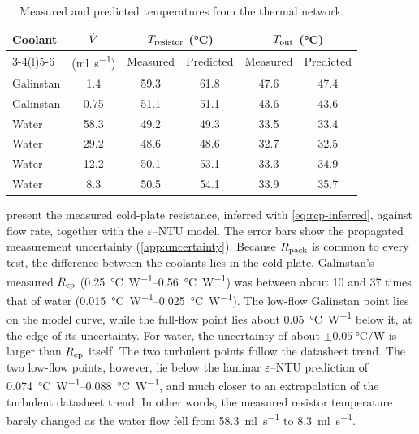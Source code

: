 \begin{table}[htbp]
  \centering
  \caption{Measured and predicted temperatures from the thermal network.}
  \label{tab:tn_results}
  \small
  \begin{tabular}{@{}lccccc@{}}
    \toprule
    Coolant & $\dot{V}$ & \multicolumn{2}{c}{$T_{\mathrm{resistor}}$ (\si{\celsius})}
         & \multicolumn{2}{c}{$T_{\mathrm{out}}$ (\si{\celsius})} \\
    \cmidrule(lr){3-4}\cmidrule(l){5-6}
         & (\si{\milli\litre\per\second}) & Measured & Predicted & Measured & Predicted \\
    \midrule
    Galinstan & 1.4               & 59.3 & 61.8 & 47.6 & 47.4 \\
    Galinstan & 0.75\tnote{a}     & 51.1 & 51.1 & 43.6 & 43.6 \\
    Water     & 58.3\tnote{b}     & 49.2 & 49.3 & 33.5 & 33.4 \\
    Water     & 29.2\tnote{b}     & 48.6 & 48.6 & 32.7 & 32.5 \\
    Water     & 12.2              & 50.1 & 53.1 & 33.3 & 34.9 \\
    Water     & 8.3               & 50.5 & 54.1 & 33.9 & 35.7 \\
    \bottomrule
  \end{tabular}
\end{table}

 present the measured cold-plate
resistance, inferred with \cref{eq:rcp-inferred}, against flow rate, together
with the $\varepsilon$--NTU model. The error bars show the propagated
measurement uncertainty (\cref{app:uncertainty}). Because $R_{\mathrm{pack}}$ is common to
every test, the difference between the coolants lies in the cold plate.
Galinstan's measured $R_{\mathrm{cp}}$ (\SIrange{0.25}{0.56}{\celsius\per\watt}) was
between about 10 and 37 times that of water
(\SIrange{0.015}{0.025}{\celsius\per\watt}). The low-flow Galinstan point lies
on the model curve, while the full-flow point lies about
\SI{0.05}{\celsius\per\watt} below it, at the edge of its uncertainty. For
water, the uncertainty of about $\pm\SI{0.05}{\celsius\per\watt}$ is larger than
$R_{\mathrm{cp}}$ itself. The two turbulent points
follow the datasheet trend. The two low-flow points, however, lie below the
laminar $\varepsilon$--NTU prediction of \SIrange{0.074}{0.088}{\celsius\per\watt}, and much closer to an extrapolation of the
turbulent datasheet trend. In other words, the measured resistor temperature
barely changed as the water flow fell from \SI{58.3}{\milli\litre\per\second} to
\SI{8.3}{\milli\litre\per\second}.

